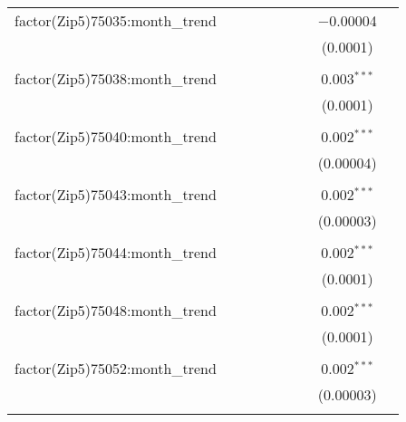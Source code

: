 \begin{table}[H]
{\begin{tabular}{@{\extracolsep{5pt}}lcccccccc}
  factor(Zip5)75035:month\_trend &  &  &  &  &  &  & $-$0.00004 &  \\  

   &  &  &  &  &  &  & (0.0001) &  \\  

   & & & & & & & & \\  

  factor(Zip5)75038:month\_trend &  &  &  &  &  &  & 0.003$^{***}$ &  \\  

   &  &  &  &  &  &  & (0.0001) &  \\  

   & & & & & & & & \\  

  factor(Zip5)75040:month\_trend &  &  &  &  &  &  & 0.002$^{***}$ &  \\  

   &  &  &  &  &  &  & (0.00004) &  \\  

   & & & & & & & & \\  

  factor(Zip5)75043:month\_trend &  &  &  &  &  &  & 0.002$^{***}$ &  \\  

   &  &  &  &  &  &  & (0.00003) &  \\  

   & & & & & & & & \\  

  factor(Zip5)75044:month\_trend &  &  &  &  &  &  & 0.002$^{***}$ &  \\  

   &  &  &  &  &  &  & (0.0001) &  \\  

   & & & & & & & & \\  

  factor(Zip5)75048:month\_trend &  &  &  &  &  &  & 0.002$^{***}$ &  \\  

   &  &  &  &  &  &  & (0.0001) &  \\  

   & & & & & & & & \\  

  factor(Zip5)75052:month\_trend &  &  &  &  &  &  & 0.002$^{***}$ &  \\  

   &  &  &  &  &  &  & (0.00003) &  \\  

   & & & & & & & & \\  


\end{tabular}}
\end{table}
